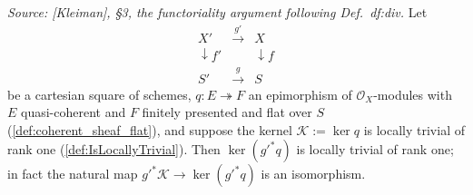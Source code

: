 \begin{lemma}\leanok
  \label{lem:relative_divisor_base_change}
  \textit{Source: [Kleiman], \S 3, the functoriality argument following
  Def.~df:div.}
  Let
  \[
    \begin{array}{ccc}
      X' & \xrightarrow{\ g'\ } & X \\
      \downarrow f' & & \downarrow f \\
      S' & \xrightarrow{\ g\ } & S
    \end{array}
  \]
  be a cartesian square of schemes, \(q : E \twoheadrightarrow F\) an
  epimorphism of \(\mathcal O_X\)-modules with \(E\) quasi-coherent and
  \(F\) finitely presented and flat over \(S\)
  (\cref{def:coherent_sheaf_flat}), and suppose the kernel
  \(\mathcal K := \ker q\) is locally trivial of rank one
  (\cref{def:IsLocallyTrivial}).  Then \(\ker (g'^* q)\) is locally trivial
  of rank one; in fact the natural map \(g'^* \mathcal K \to \ker(g'^* q)\)
  is an isomorphism.
\end{lemma}
